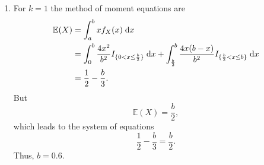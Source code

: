 \documentclass{article}
\begin{document}
\begin{enumerate}
  \item For $k = 1$ the method of moment equations are \begin{align}
    \mathbb{E}(X) &= \int_a^b x f_X(x) \; \mathrm{d}x \notag \\
    &= \int_0^b \frac{4x^2}{b^2}I_{\{0<x\leq\frac{b}{2}\}} \; \mathrm{d}x + \int_\frac{b}{2}^b \frac{4x(b-x)}{b^2}I_{\{\frac{b}{2} < x \leq b\}} \; \mathrm{d}x \notag \\
    &= \frac{1}{2} -\frac{b}{3}. \notag
  \end{align}
  But \[\mathbb{E}(X) = \frac{b}{2},\]which leads to the system of equations \[\frac{1}{2} - \frac{b}{3} = \frac{b}{2}.\]Thus, $b = 0.6$.
\end{enumerate}
\end{document}
